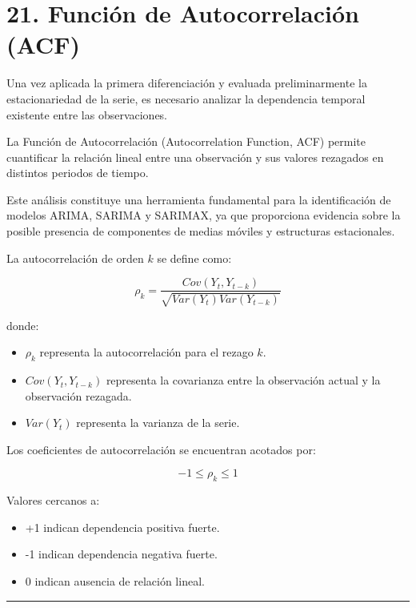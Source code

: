 \documentclass[11pt]{article}
\providecommand{\tightlist}{%
      \setlength{\itemsep}{0pt}\setlength{\parskip}{0pt}}
\begin{document}
    \hypertarget{funciuxf3n-de-autocorrelaciuxf3n-acf}{%
\section{21. Función de Autocorrelación
(ACF)}\label{funciuxf3n-de-autocorrelaciuxf3n-acf}}

Una vez aplicada la primera diferenciación y evaluada preliminarmente la
estacionariedad de la serie, es necesario analizar la dependencia
temporal existente entre las observaciones.

La Función de Autocorrelación (Autocorrelation Function, ACF) permite
cuantificar la relación lineal entre una observación y sus valores
rezagados en distintos periodos de tiempo.

Este análisis constituye una herramienta fundamental para la
identificación de modelos ARIMA, SARIMA y SARIMAX, ya que proporciona
evidencia sobre la posible presencia de componentes de medias móviles y
estructuras estacionales.

La autocorrelación de orden \(k\) se define como:

\[
\rho_k =
\frac{
Cov(Y_t,Y_{t-k})
}
{
\sqrt{Var(Y_t)Var(Y_{t-k})}
}
\]

donde:

\begin{itemize}
\tightlist
\item
  \(\rho_k\) representa la autocorrelación para el rezago \(k\).
\item
  \(Cov(Y_t,Y_{t-k})\) representa la covarianza entre la observación
  actual y la observación rezagada.
\item
  \(Var(Y_t)\) representa la varianza de la serie.
\end{itemize}

Los coeficientes de autocorrelación se encuentran acotados por:

\[
-1 \le \rho_k \le 1
\]

Valores cercanos a:

\begin{itemize}
\tightlist
\item
  +1 indican dependencia positiva fuerte.
\item
  -1 indican dependencia negativa fuerte.
\item
  0 indican ausencia de relación lineal.
\end{itemize}

\begin{center}\rule{0.5\linewidth}{0.5pt}\end{center}
\end{document}
